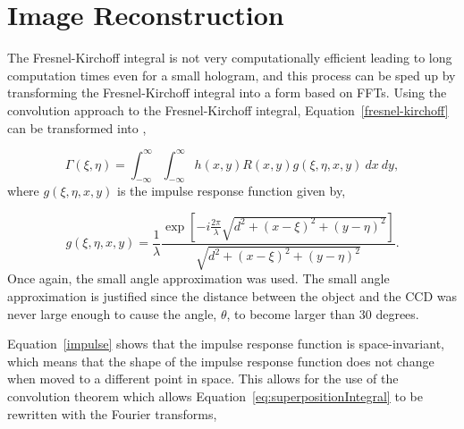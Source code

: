 

    \section{Image Reconstruction}

    The Fresnel-Kirchoff integral is not very computationally efficient
    leading to long computation times even for a small hologram, and this process can be
    sped up by transforming the Fresnel-Kirchoff integral into a form based
    on FFTs.
    Using the convolution approach to the Fresnel-Kirchoff integral,
    Equation~\ref{fresnel-kirchoff} can be transformed into
    \cite{schnars_digital_2002},

    \begin{equation}
        \Gamma(\xi,\eta) = \int_{-\infty}^{\infty}\int_{-\infty}^{\infty}
        h(x,y)R(x,y) g(\xi,\eta,x,y)~dx~dy,
        \label{eq:superpositionIntegral}
    \end{equation}
    where $g(\xi,\eta,x,y)$ is the impulse response function given by,

    \begin{equation}
        g(\xi,\eta,x,y)=\frac{1}{\lambda}\frac{\exp\left[
        -i\frac{2\pi}{\lambda}\sqrt{d^{2}+(x-\xi)^{2}+(y-\eta)^{2}}
    \right]}{\sqrt{d^{2}+(x-\xi)^{2}+(y-\eta)^{2}}}.
        \label{impulse}
    \end{equation}
    Once again, the small angle approximation was used. The small angle
    approximation is justified since the distance between the object and the
    CCD was never large enough to cause the angle,
    $\theta$, to become larger than 30 degrees. 

    Equation~\ref{impulse}
    shows that the impulse response function is space-invariant,
    which means that the shape of the impulse response function does not change
    when moved to a different point in space.
    This allows for the
    use of the convolution theorem which
    allows
    Equation~\ref{eq:superpositionIntegral} 
    to be rewritten with the Fourier transforms,


